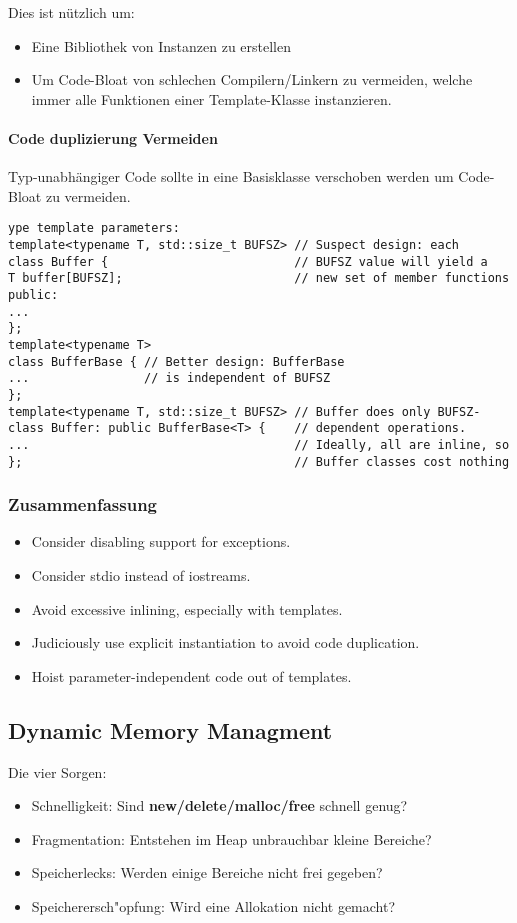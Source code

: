 Dies ist nützlich um:
\begin{itemize}
	\item Eine Bibliothek von Instanzen zu erstellen
	\item Um Code-Bloat von schlechen Compilern/Linkern zu vermeiden, welche immer alle Funktionen einer Template-Klasse instanzieren.
\end{itemize}

\paragraph{Code duplizierung Vermeiden}
Typ-unabhängiger Code sollte in eine Basisklasse verschoben werden um
Code-Bloat zu vermeiden.
\begin{lstlisting}ype template parameters:
template<typename T, std::size_t BUFSZ> // Suspect design: each
class Buffer {                          // BUFSZ value will yield a
T buffer[BUFSZ];                        // new set of member functions
public:
...
};
template<typename T>
class BufferBase { // Better design: BufferBase
...                // is independent of BUFSZ
};
template<typename T, std::size_t BUFSZ> // Buffer does only BUFSZ-
class Buffer: public BufferBase<T> {    // dependent operations.
...                                     // Ideally, all are inline, so
};                                      // Buffer classes cost nothing
\end{lstlisting}

\subsubsection{Zusammenfassung}
\begin{itemize}
\item Consider disabling support for exceptions.
\item Consider stdio instead of iostreams.
\item Avoid excessive inlining, especially with templates.
\item Judiciously use explicit instantiation to avoid code duplication.
\item Hoist parameter-independent code out of templates.
\end{itemize}

\subsection{Dynamic Memory Managment}
Die vier Sorgen:
\begin{itemize}
\item Schnelligkeit: Sind \textbf{new/delete/malloc/free} schnell genug?
\item Fragmentation: Entstehen im Heap unbrauchbar kleine Bereiche?
\item Speicherlecks: Werden einige Bereiche nicht frei gegeben?
\item Speicherersch"opfung: Wird eine Allokation nicht gemacht?
\end{itemize}

